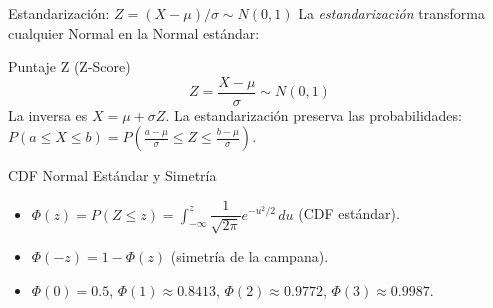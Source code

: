 \documentclass[10pt, aspectratio=169]{beamer}
\begin{document}
\begin{frame}{Estandarización: $Z = (X - \mu)/\sigma \sim N(0, 1)$}
  \footnotesize
  La \emph{estandarización} transforma cualquier Normal en la Normal estándar: \pause

  \vspace{0.1cm}
  \begin{block}{Puntaje Z (Z-Score)}
    $$Z = \dfrac{X - \mu}{\sigma} \sim N(0, 1)$$
    La inversa es $X = \mu + \sigma Z$. La estandarización preserva las probabilidades: $P(a \le X \le b) = P\left(\frac{a-\mu}{\sigma} \le Z \le \frac{b-\mu}{\sigma}\right)$.
  \end{block}

  \vspace{0.1cm}
  \pause
  \begin{alertblock}{CDF Normal Estándar y Simetría}
    \begin{itemize}\itemsep=0.05cm
      \item $\Phi(z) = P(Z \le z) = \int_{-\infty}^{z} \dfrac{1}{\sqrt{2\pi}} e^{-u^{2}/2}\,du$ (CDF estándar).
      \item $\Phi(-z) = 1 - \Phi(z)$ (simetría de la campana).
      \item $\Phi(0) = 0.5$, $\Phi(1) \approx 0.8413$, $\Phi(2) \approx 0.9772$, $\Phi(3) \approx 0.9987$.
    \end{itemize}
  \end{alertblock}
\end{frame}
\end{document}
